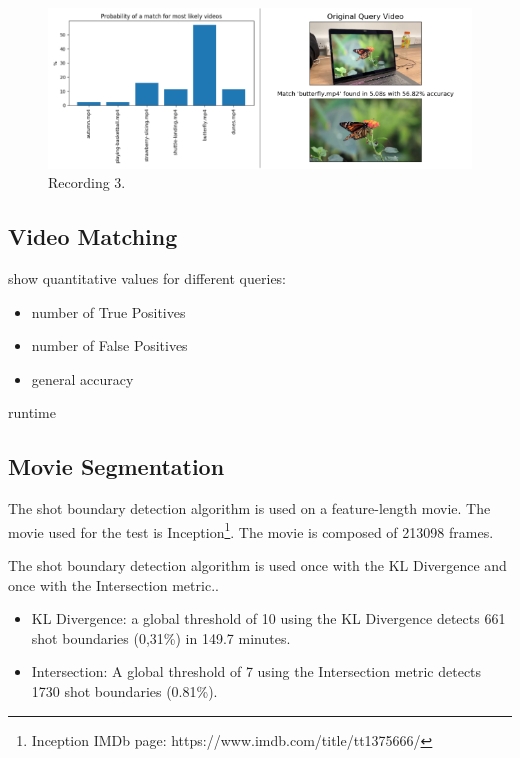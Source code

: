 \begin{figure}[h] 
\centerline{\includegraphics[width=\textwidth]{figures/evaluation/recording3-results.png}}
\caption{\label{fig:design-recording3-results}Recording 3.}
\end{figure}

\subsection{Video Matching}

show quantitative values for different queries:
    \begin{itemize}
        \item number of True Positives 
        \item number of False Positives
        \item general accuracy
    \end{itemize}

runtime

\subsection{Movie Segmentation}

The shot boundary detection algorithm is used on a feature-length movie. The movie used for the test is Inception\footnote{Inception IMDb page: https://www.imdb.com/title/tt1375666/}. The movie is composed of 213098 frames.

The shot boundary detection algorithm is used once with the KL Divergence and once with the Intersection metric..

\begin{itemize}
    \item KL Divergence: a global threshold of 10 using the KL Divergence detects 661 shot boundaries (0,31\%) in 149.7 minutes.
    \item Intersection: A global threshold of 7 using the Intersection metric detects 1730 shot boundaries (0.81\%).
\end{itemize}

